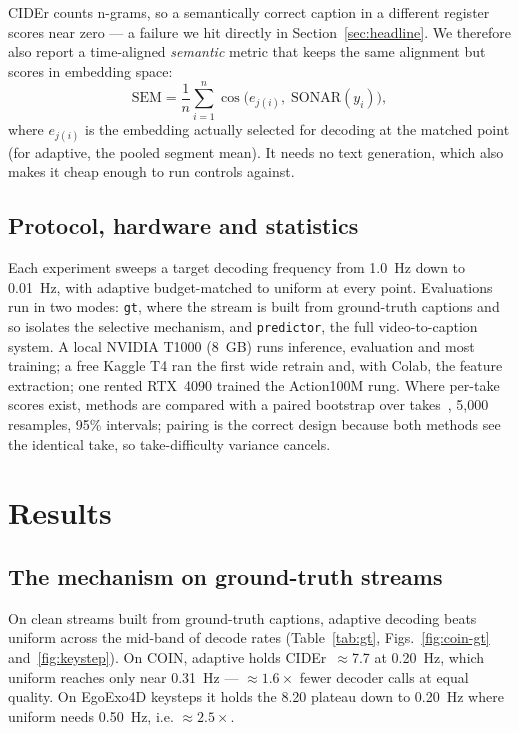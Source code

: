 \documentclass[journal]{IEEEtran}
\begin{document}
CIDEr counts n-grams, so a semantically correct caption in a different register
scores near zero --- a failure we hit directly in Section~\ref{sec:headline}. We
therefore also report a time-aligned \emph{semantic} metric that keeps the same
alignment but scores in embedding space:
\begin{equation}
\mathrm{SEM} = \frac{1}{n}\sum_{i=1}^{n}
\cos\big(e_{j(i)},\; \mathrm{SONAR}(y_i)\big),
\end{equation}
where $e_{j(i)}$ is the embedding actually selected for decoding at the matched
point (for adaptive, the pooled segment mean). It needs no text generation, which
also makes it cheap enough to run controls against.

\subsection{Protocol, hardware and statistics}
Each experiment sweeps a target decoding frequency from 1.0~Hz down to 0.01~Hz,
with adaptive budget-matched to uniform at every point. Evaluations run in two
modes: \texttt{gt}, where the stream is built from ground-truth captions and so
isolates the selective mechanism, and \texttt{predictor}, the full
video-to-caption system. A local NVIDIA T1000 (8~GB) runs inference, evaluation
and most training; a free Kaggle T4 ran the first wide retrain and, with Colab,
the feature extraction; one rented RTX~4090 trained the Action100M rung. Where
per-take scores exist, methods are compared with a paired bootstrap over
takes~\cite{efron1993}, 5{,}000 resamples, 95\% intervals; pairing is the correct
design because both methods see the identical take, so take-difficulty variance
cancels.

\section{Results}
\label{sec:results}

\subsection{The mechanism on ground-truth streams}
On clean streams built from ground-truth captions, adaptive decoding beats uniform
across the mid-band of decode rates (Table~\ref{tab:gt}, Figs.~\ref{fig:coin-gt}
and~\ref{fig:keystep}). On COIN, adaptive holds CIDEr~$\approx$7.7 at 0.20~Hz,
which uniform reaches only near 0.31~Hz --- $\approx 1.6\times$ fewer decoder
calls at equal quality. On EgoExo4D keysteps it holds the 8.20 plateau down to
0.20~Hz where uniform needs 0.50~Hz, i.e. $\approx 2.5\times$.
\end{document}
